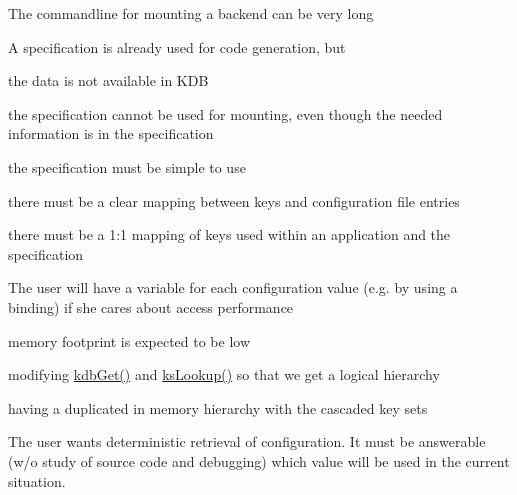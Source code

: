 
\begin{DoxyItemize}
\item The commandline for mounting a backend can be very long
\item A specification is already used for code generation, but
\begin{DoxyItemize}
\item the data is not available in K\+DB
\item the specification cannot be used for mounting, even though the needed information is in the specification
\end{DoxyItemize}
\end{DoxyItemize}


\begin{DoxyItemize}
\item the specification must be simple to use
\item there must be a clear mapping between keys and configuration file entries
\item there must be a 1\+:1 mapping of keys used within an application and the specification
\end{DoxyItemize}


\begin{DoxyItemize}
\item The user will have a variable for each configuration value (e.\+g. by using a binding) if she cares about access performance
\item memory footprint is expected to be low
\end{DoxyItemize}


\begin{DoxyItemize}
\item modifying \mbox{\hyperlink{group__kdb_ga28e385fd9cb7ccfe0b2f1ed2f62453a1}{kdb\+Get()}} and \mbox{\hyperlink{group__keyset_gaa34fc43a081e6b01e4120daa6c112004}{ks\+Lookup()}} so that we get a logical hierarchy
\item having a duplicated in memory hierarchy with the cascaded key sets
\end{DoxyItemize}


\begin{DoxyItemize}
\item The user wants deterministic retrieval of configuration. It must be answerable (w/o study of source code and debugging) which value will be used in the current situation.
\end{DoxyItemize}


